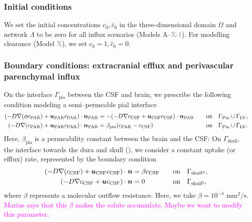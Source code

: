 \documentclass[fleqn,10pt]{wlscirep}
\newcommand{\mer}[1]{\textcolor{magenta}{#1}}
\newcommand{\draft}[1]{\textcolor{gray}{#1}}
\newcommand{\pia}{\Gamma_{\rm{Pia}}}
\begin{document}
\subsubsection*{Initial conditions}

We set the initial concentrations $c_0, \hat{c}_0$ in the three-dimensional domain $\Omega$ and network $\Lambda$ to be zero for all influx scenarios (Models A--\draft{X-1}). For modelling clearance (Model \draft{X}), we set $c_0 = 1, \hat{c}_0 = 0$.

\subsubsection*{Boundary conditions: extracranial efflux and perivascular parenchymal influx}
On the interface $\Gamma_{\mathrm{pia}}$ between the CSF and brain, we prescribe the following condition modeling a semi--permeable pial interface 
\begin{alignat}{2}
(-D \nabla (\phi c_{\rm{PAR}}) + \bm u_{\rm{PAR}} c_{\rm{PAR} }) \cdot \bm{n}_{\rm{PAR}} &= - (- D \nabla c_{\rm{CSF}} + \bm u_{\rm{CSF}} c_{\rm{CSF}} ) \cdot \bm{n}_{\rm{PAR}} &&  \quad  \mathrm{on} \quad \pia \cup \Gamma_{\mathrm{LV}} ,  \\  
(-D \nabla ( c_{\rm{PAR}}) + \bm u_{\rm{PAR}} c_{\rm{PAR} }) \cdot \bm{n}_{\rm{PAR}} & = \beta_{\rm{pia}} (c_{\rm PAR} - c_{\mathrm{CSF}}) &&  \quad  \mathrm{on} \quad  \pia \cup \Gamma_{\mathrm{LV}} .  
\end{alignat} 
Here, $\beta_{\mathrm{pia}}$ is a permeability constant between the brain and the CSF: On $\Gamma_{\mathrm{skull}}$, the interface towards the dura and skull (), we consider a constant uptake (or efflux) rate, represented by the boundary condition 
\begin{alignat}{2}
(- D \nabla ( c_{\mathrm{CSF}}) + \bm u_{\mathrm{CSF}} c_{\mathrm{CSF}}) \cdot \bm{n}   & = \beta c_{\mathrm{CSF}}  && \quad \mathrm{on} \quad \Gamma_{\mathrm{skull}^{\rm u}},\\ 
(-D \nabla c_{\rm CSF} + \bm u c_{\rm CSF}) \cdot \bm{n} & =  0   &&  \quad  \mathrm{on} \quad \Gamma_{\rm skull^{l}} , 
\end{alignat}
where $\beta$ represents a molecular outflow resistance. Here, we take $\beta = 10^{-4} \,\, \mathrm{mm}^2/\mathrm{s}$\cite{hornkjol2022csf}.
\mer{Marius says that this $\beta$ makes the solute accumulate. Maybe we want to modify this parameter.}
\end{document}
